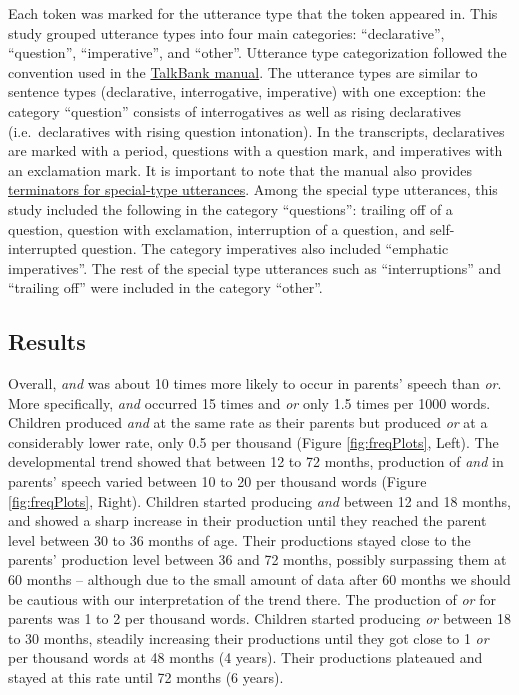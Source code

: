 \documentclass[,man,floatsintext]{apa6}
\begin{document}
Each token was marked for the utterance type that the token appeared in. This study grouped utterance types into four main categories: \enquote{declarative}, \enquote{question}, \enquote{imperative}, and \enquote{other}. Utterance type categorization followed the convention used in the \href{https://talkbank.org/manuals/CHAT.html\#_Toc486414422}{TalkBank manual}. The utterance types are similar to sentence types (declarative, interrogative, imperative) with one exception: the category \enquote{question} consists of interrogatives as well as rising declaratives (i.e.~declaratives with rising question intonation). In the transcripts, declaratives are marked with a period, questions with a question mark, and imperatives with an exclamation mark. It is important to note that the manual also provides \href{https://talkbank.org/manuals/CHAT.html\#_Toc486414431}{terminators for special-type utterances}. Among the special type utterances, this study included the following in the category \enquote{questions}: trailing off of a question, question with exclamation, interruption of a question, and self-interrupted question. The category imperatives also included \enquote{emphatic imperatives}. The rest of the special type utterances such as \enquote{interruptions} and \enquote{trailing off} were included in the category \enquote{other}.

\hypertarget{study1results}{%
\subsection{Results}\label{study1results}}

Overall, \emph{and} was about 10 times more likely to occur in parents' speech than \emph{or}. More specifically, \emph{and} occurred 15 times and \emph{or} only 1.5 times per 1000 words. Children produced \emph{and} at the same rate as their parents but produced \emph{or} at a considerably lower rate, only 0.5 per thousand (Figure \ref{fig:freqPlots}, Left). The developmental trend showed that between 12 to 72 months, production of \emph{and} in parents' speech varied between 10 to 20 per thousand words (Figure \ref{fig:freqPlots}, Right). Children started producing \emph{and} between 12 and 18 months, and showed a sharp increase in their production until they reached the parent level between 30 to 36 months of age. Their productions stayed close to the parents' production level between 36 and 72 months, possibly surpassing them at 60 months -- although due to the small amount of data after 60 months we should be cautious with our interpretation of the trend there. The production of \emph{or} for parents was 1 to 2 per thousand words. Children started producing \emph{or} between 18 to 30 months, steadily increasing their productions until they got close to 1 \emph{or} per thousand words at 48 months (4 years). Their productions plateaued and stayed at this rate until 72 months (6 years).
\end{document}

